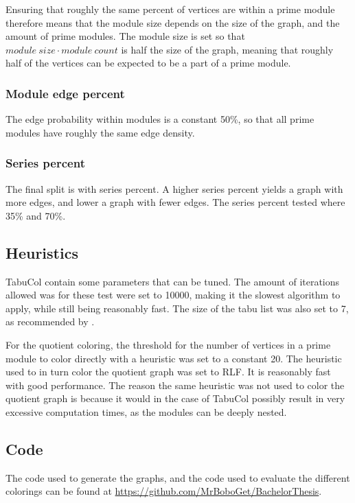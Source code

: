 \documentclass[a4paper]{article}
\begin{document}
Ensuring that roughly the same percent of vertices are within a prime module
therefore means that the module size depends on the size of the graph, and the
amount of prime modules. The module size is set so that $module\ size \cdot
module\ count$ is half the size of the graph, meaning that roughly half of the
vertices can be expected to be a part of a prime module.

\subsubsection{Module edge percent}
The edge probability within modules is a  constant 50\%, so that all
prime modules have roughly the same edge density. 

\subsubsection{Series percent}
The final split is with series percent. A higher series percent yields a graph
with more edges, and lower a graph with fewer  edges. The series percent tested
where 35\% and 70\%.

\subsection{Heuristics}
TabuCol contain some parameters that can be tuned. The amount of
iterations allowed was for these test were set to 10000, making it the slowest
algorithm to apply, while still being reasonably fast. The size of the tabu list 
was also set to 7, as recommended by \cite{1990}.

For the quotient coloring, the threshold for the number of vertices in a prime
module to color directly with a heuristic was set to a constant 20. The
heuristic used to in turn color the quotient graph was set to RLF. It is
reasonably fast with good performance. The reason the same heuristic was not
used to color the quotient graph is because it would in the case of TabuCol
possibly result in very excessive computation times, as the modules can be
deeply nested.


\subsection{Code}

The code used to generate the graphs, and the code used to evaluate the
different colorings can be found at
\url{https://github.com/MrBoboGet/BachelorThesis}. 
\end{document}
